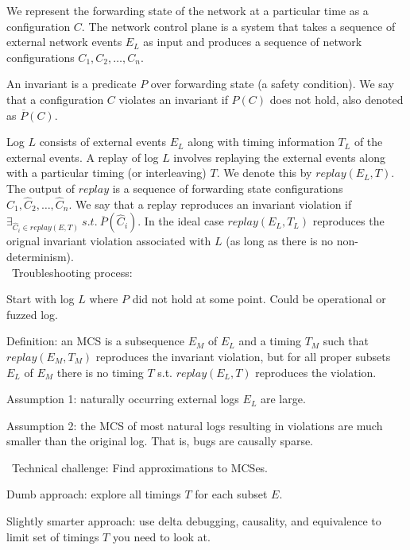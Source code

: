 We represent the forwarding state of the network
at a particular time as a configuration $C$.
The network control plane is a system that takes a sequence of
external network events $E_L$
as input and produces a sequence of network configurations
$C_1,C_2,\dots,C_n$.

An invariant is a predicate $P$ over forwarding state (a safety
condition). We say that a configuration
$C$ violates an invariant if $P(C)$ does not
hold, also denoted as $\overline{P}(C)$.

Log $L$ consists of external events $E_L$
along with timing information $T_L$ of the external events.
A replay of log $L$ involves replaying the external events along with a particular timing
(or interleaving) $T$.
We denote this by $replay(E_L,T)$.
The output of $replay$ is a sequence of forwarding state configurations
$\hat{C}_1,\hat{C}_2,\dots,\hat{C}_n$.
We say that a replay reproduces an invariant violation if
$\exists_{\hat{C}_i \in replay(E,T)}\:s.t.\:\overline{P}(\hat{C}_i)$.
In the ideal case $replay(E_L,T_L)$ reproduces the orignal invariant violation
associated with $L$ (as long as there is no non-determinism). \\

\noindent~Troubleshooting process:

\begin{outline}
\1 Start with log $L$ where $P$ did not hold at some point. Could be operational or fuzzed log.

\1 Definition: an MCS is a subsequence $E_M$ of $E_L$ and a timing $T_M$ such
that $replay(E_M,T_M)$ reproduces the invariant violation, but for all proper
subsets $E_L$ of $E_M$
there is no timing $T$ s.t. $replay(E_L,T)$ reproduces the violation.

\1 Assumption 1: naturally occurring external logs $E_L$ are large.

\1 Assumption 2: the MCS of most natural logs resulting in violations are much smaller than the original log.  That is, bugs are causally sparse.
\end{outline}

\noindent~Technical challenge: Find approximations to MCSes.

\begin{outline}
\1 Dumb approach: explore all timings $T$ for each subset $E$.

\1 Slightly smarter approach: use delta debugging, causality, and equivalence to limit set of timings $T$ you need to look at.
\end{outline}
